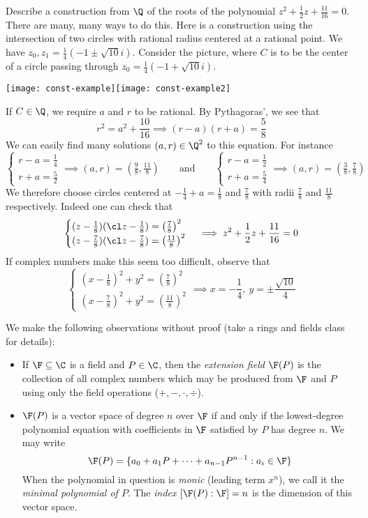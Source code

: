 Describe a construction from $\Q$ of the roots of the polynomial $z^2+\frac 12z+\frac{11}{16}=0$.\\[5pt]
There are many, many ways to do this. Here is a construction using the intersection of two circles with rational radius centered at a rational point. We have $z_0,z_1=\frac 14(-1\pm\sqrt{10}i)$. Consider the picture, where $C$ is to be the center of a circle passing through $z_0=\frac 14(-1+\sqrt{10}i)$.
\begin{center}
\texttt{[image: const-example]}\qquad\texttt{[image: const-example2]}
\end{center}
If $C\in\Q$, we require $a$ and $r$ to be rational. By Pythagoras', we see that
\[r^2=a^2+\frac{10}{16}\implies (r-a)(r+a)=\frac 58\]
We can easily find many solutions $(a,r)\in\Q^2$ to this equation. For instance
\[\begin{cases}
r-a=\frac 14\\
r+a=\frac 52
\end{cases}\implies (a,r)=(\tfrac 98,\tfrac{11}8)\qquad\text{and}\qquad
\begin{cases}
r-a=\frac 12\\
r+a=\frac 54
\end{cases}\implies (a,r)=(\tfrac 38,\tfrac 78)\]
We therefore choose circles centered at $-\frac 14+a=\frac 18$ and $\frac 78$ with radii $\frac 78$ and $\frac{11}8$ respectively. Indeed one can check that
\[\begin{cases}
(z-\frac 18)(\cl z-\frac 18)=\left(\frac 78\right)^2\\
(z-\frac 78)(\cl z-\frac 78)=\left(\frac{11}8\right)^2
\end{cases}\implies z^2+\frac 12z+\frac{11}{16}=0\]
If complex numbers make this seem too difficult, observe that
\[\begin{cases}
(x-\frac 18)^2+y^2=\left(\frac 78\right)^2\\
(x-\frac 78)^2+y^2=\left(\frac{11}8\right)^2
\end{cases}\implies x=-\frac 14,\ y=\pm\frac{\sqrt{10}}4\]
\goodbreak

We make the following observations without proof (take a rings and fields class for details):
\begin{itemize}
  \item If $\F\subseteq\C$ is a field and $P\in\C$, then the \emph{extension field} $\F(P)$ is the collection of all complex numbers which may be produced from $\F$ and $P$ using only the field operations ($+,-,\cdot,\div$).
  \item $\F(P)$ is a vector space of degree $n$ over $\F$ if and only if the lowest-degree polynomial equation with coefficients in $\F$ satisfied by $P$ has degree $n$. We may write
  \[\F(P)=\{a_0+a_1P+\cdots+a_{n-1}P^{n-1}:a_i\in\F\}\]
  When the polynomial in question is \emph{monic} (leading term $x^n$), we call it the \emph{minimal polynomial of $P$}. The \emph{index} $[\F(P):\F]=n$ is the dimension of this vector space. 
\end{itemize}

